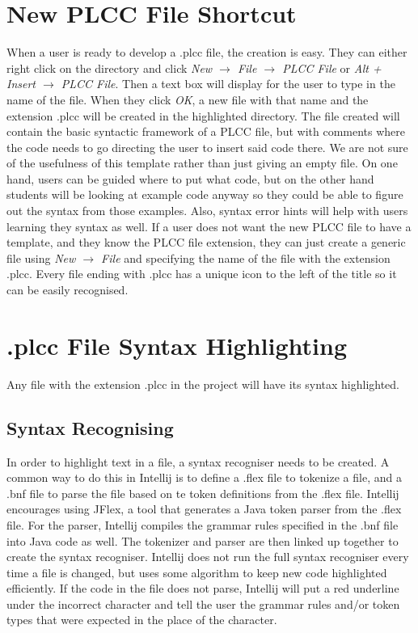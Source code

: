 \documentclass[conference, letterpaper]{IEEEtran}
\begin{document}
\section{New PLCC File Shortcut}\label{sec:new-plcc-file-shortcut}
When a user is ready to develop a .plcc file, the creation is easy.
They can either right click on the directory and click \textit{New $\rightarrow$ File $\rightarrow$ PLCC File} or \textit{Alt + Insert $\rightarrow$ PLCC File}.
Then a text box will display for the user to type in the name of the file.
When they click \textit{OK}, a new file with that name and the extension .plcc will be created in the highlighted directory.
The file created will contain the basic syntactic framework of a PLCC file, but with comments where the code needs to go directing the user to insert said code there.
We are not sure of the usefulness of this template rather than just giving an empty file.
On one hand, users can be guided where to put what code, but on the other hand students will be looking at example code anyway so they could be able to figure out the syntax from those examples.
Also, syntax error hints will help with users learning they syntax as well.
If a user does not want the new PLCC file to have a template, and they know the PLCC file extension, they can just create a generic file using \textit{New $\rightarrow$ File} and specifying the name of the file with the extension .plcc.
Every file ending with .plcc has a unique icon to the left of the title so it can be easily recognised.


\section{.plcc File Syntax Highlighting}\label{sec:new-.plcc-file-syntax-highlighting}
Any file with the extension .plcc in the project will have its syntax highlighted.

\subsection{Syntax Recognising}\label{subsec:syntax-recognising}
In order to highlight text in a file, a syntax recogniser needs to be created.
A common way to do this in Intellij is to define a .flex file to tokenize a file, and a .bnf file to parse the file based on te token definitions from the .flex file.
Intellij encourages using JFlex, a tool that generates a Java token parser from the .flex file.
For the parser, Intellij compiles the grammar rules specified in the .bnf file into Java code as well.
The tokenizer and parser are then linked up together to create the syntax recogniser.
Intellij does not run the full syntax recogniser every time a file is changed, but uses some algorithm to keep new code highlighted efficiently.
If the code in the file does not parse, Intellij will put a red underline under the incorrect character and tell the user the grammar rules and/or token types that were expected in the place of the character.
\end{document}
